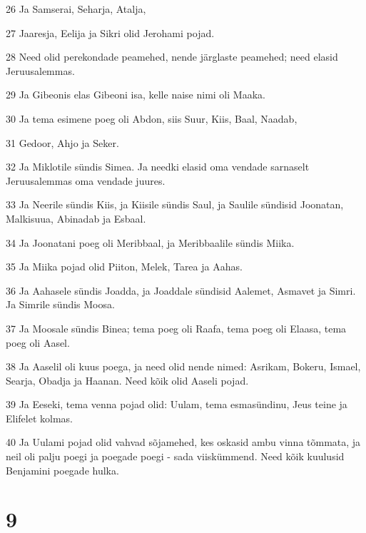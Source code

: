 \par 26 Ja Samserai, Seharja, Atalja,
\par 27 Jaaresja, Eelija ja Sikri olid Jerohami pojad.
\par 28 Need olid perekondade peamehed, nende järglaste peamehed; need elasid Jeruusalemmas.
\par 29 Ja Gibeonis elas Gibeoni isa, kelle naise nimi oli Maaka.
\par 30 Ja tema esimene poeg oli Abdon, siis Suur, Kiis, Baal, Naadab,
\par 31 Gedoor, Ahjo ja Seker.
\par 32 Ja Miklotile sündis Simea. Ja needki elasid oma vendade sarnaselt Jeruusalemmas oma vendade juures.
\par 33 Ja Neerile sündis Kiis, ja Kiisile sündis Saul, ja Saulile sündisid Joonatan, Malkisuua, Abinadab ja Esbaal.
\par 34 Ja Joonatani poeg oli Meribbaal, ja Meribbaalile sündis Miika.
\par 35 Ja Miika pojad olid Piiton, Melek, Tarea ja Aahas.
\par 36 Ja Aahasele sündis Joadda, ja Joaddale sündisid Aalemet, Asmavet ja Simri. Ja Simrile sündis Moosa.
\par 37 Ja Moosale sündis Binea; tema poeg oli Raafa, tema poeg oli Elaasa, tema poeg oli Aasel.
\par 38 Ja Aaselil oli kuus poega, ja need olid nende nimed: Asrikam, Bokeru, Ismael, Searja, Obadja ja Haanan. Need kõik olid Aaseli pojad.
\par 39 Ja Eeseki, tema venna pojad olid: Uulam, tema esmasündinu, Jeus teine ja Elifelet kolmas.
\par 40 Ja Uulami pojad olid vahvad sõjamehed, kes oskasid ambu vinna tõmmata, ja neil oli palju poegi ja poegade poegi - sada viiskümmend. Need kõik kuulusid Benjamini poegade hulka.

\chapter{9}

